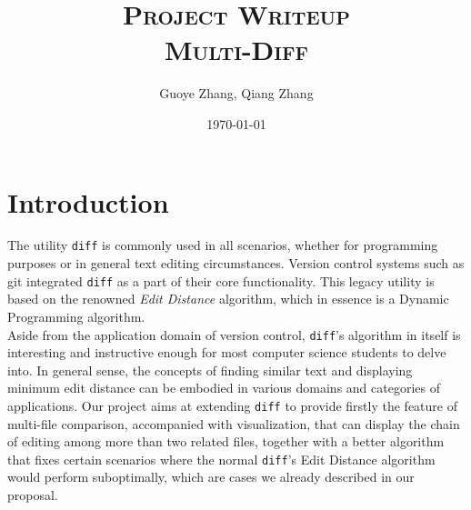 \documentclass{article}
\begin{document}
\title{\textsc{Project Writeup}\\ \textbf{\textsc{Multi-Diff}}}
\author{Guoye Zhang, Qiang Zhang}
\date{\today}
\maketitle

\section{Introduction}
The utility \texttt{diff} is commonly used in all scenarios, whether for programming purposes or in general text editing circumstances. Version control systems such as git integrated \texttt{diff} as a part of their core functionality. This legacy utility is based on the renowned \textit{Edit Distance} algorithm, which in essence is a Dynamic Programming algorithm. \\

Aside from the application domain of version control, \texttt{diff}'s algorithm in itself is interesting and instructive enough for most computer science students to delve into. In general sense, the concepts of finding similar text and displaying minimum edit distance can be embodied in various domains and categories of applications. Our project aims at extending \texttt{diff} to provide firstly the feature of multi-file comparison, accompanied with visualization, that can display the chain of editing among more than two related files, together with a better algorithm that fixes certain scenarios where the normal \texttt{diff}'s Edit Distance algorithm would perform suboptimally, which are cases we already described in our proposal.\\
\end{document}
